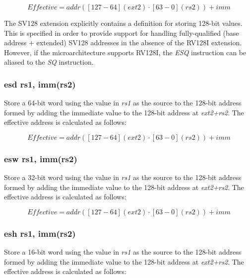 \documentclass{article}
\begin{document}
\begin{equation}
Effective = addr([127-64](ext2) \cdot [63-0](rs2))+imm
\end{equation}

\begin{commentary}
The SV128 extension explicitly contains a definition for storing 128-bit values.  
This is specified in order to provide support for handling fully-qualified (base 
address + extended) SV128 addresses in the absence of the RV128I extension.  However, 
if the microarchitecture supports RV128I, the \textit{ESQ} instruction can be aliased 
to the \textit{SQ} instruction.
\end{commentary}

\subsubsection{esd rs1, imm(rs2)}
Store a 64-bit word using the value in \textit{rs1} as the source 
to the 128-bit address formed by adding the immediate value to the 
128-bit address at \textit{ext2+rs2}.  The effective address is calculated 
as follows: 

\begin{equation}
Effective = addr([127-64](ext2) \cdot [63-0](rs2))+imm
\end{equation}

\subsubsection{esw rs1, imm(rs2)}
Store a 32-bit word using the value in \textit{rs1} as the source 
to the 128-bit address formed by adding the immediate value to the 
128-bit address at \textit{ext2+rs2}.  The effective address is calculated 
as follows: 

\begin{equation}
Effective = addr([127-64](ext2) \cdot [63-0](rs2))+imm
\end{equation}

\subsubsection{esh rs1, imm(rs2)}
Store a 16-bit word using the value in \textit{rs1} as the source 
to the 128-bit address formed by adding the immediate value to the 
128-bit address at \textit{ext2+rs2}.  The effective address is calculated 
as follows: 
\end{document}
